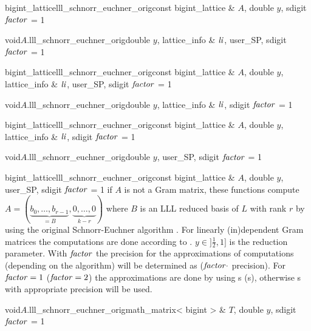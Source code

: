 \begin{fcode}{bigint_lattice}{lll_schnorr_euchner_orig}{const bigint_lattice & $A$,
    double $y$, sdigit $\mathit{factor}$ = 1}%
\end{fcode}

\begin{fcode}{void}{$A$.lll_schnorr_euchner_orig}{double $y$, lattice_info & $\mathit{li}$,
    user_SP, sdigit $\mathit{factor}$ = 1}%
\end{fcode}

\begin{fcode}{bigint_lattice}{lll_schnorr_euchner_orig}{const bigint_lattice & $A$,
    double $y$, lattice_info & $\mathit{li}$, user_SP, sdigit $\mathit{factor}$ = 1}%
\end{fcode}

\begin{fcode}{void}{$A$.lll_schnorr_euchner_orig}{double $y$, lattice_info & $\mathit{li}$,
    sdigit $\mathit{factor}$ = 1}%
\end{fcode}

\begin{fcode}{bigint_lattice}{lll_schnorr_euchner_orig}{const bigint_lattice & $A$,
    double $y$, lattice_info & $\mathit{li}$, sdigit $\mathit{factor}$ = 1}%
\end{fcode}

\begin{fcode}{void}{$A$.lll_schnorr_euchner_orig}{double $y$, user_SP, sdigit $\mathit{factor}$ = 1}
\end{fcode}

\begin{fcode}{bigint_lattice}{lll_schnorr_euchner_orig}{const bigint_lattice & $A$,
    double $y$, user_SP, sdigit $\mathit{factor}$ = 1}%
  if $A$ is not a Gram matrix, these functions compute $A = (\underbrace{b_0, \dots,
    b_{r-1}}_{=B},\underbrace{0, \dots, 0}_{k-r})$ where $B$ is an LLL reduced basis of $L$ with
  rank $r$ by using the original Schnorr-Euchner algorithm \cite{Schnorr/Euchner:1994}.  For
  linearly (in)dependent Gram matrices the computations are done according to \cite{Cohen:1995}.
  $y\in ]\frac{1}{2},1]$ is the reduction parameter.  With $\mathit{factor}$ the precision for the
  approximations of computations (depending on the algorithm) will be determined as ($\mathit{factor}
  \cdot$  precision).  For $\mathit{factor} = 1$ ($\mathit{factor} = 2$) the approximations are
  done by using s (s), otherwise s with appropriate
  precision will be used.
\end{fcode}

\begin{fcode}{void}{$A$.lll_schnorr_euchner_orig}{math_matrix< bigint > & $T$, double $y$,
    sdigit $\mathit{factor}$ = 1}%
\end{fcode}

